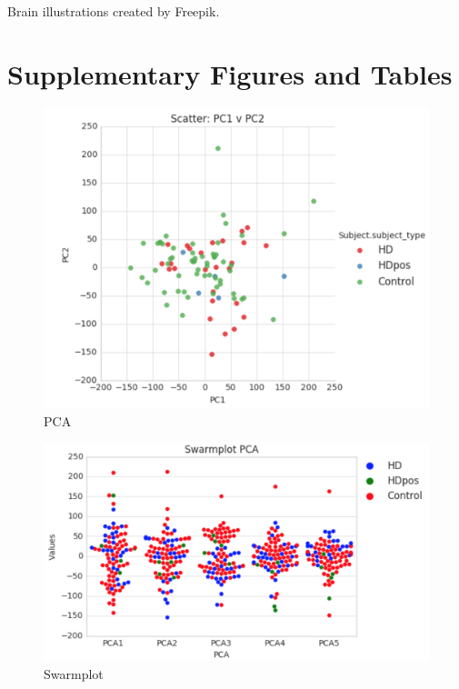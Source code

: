\documentclass[fleqn,10pt,table]{wlscirep}
\begin{document}
Brain illustrations created by Freepik.



\section*{Supplementary Figures and Tables}


\begin{figure}[ht]
\includegraphics[width=0.5\linewidth]{PCA.png}
\caption{PCA}
\end{figure}

\begin{figure}[ht]
\includegraphics[width=0.5\linewidth]{PCA_swarm.png}
\caption{Swarmplot}
\end{figure}
\end{document}
